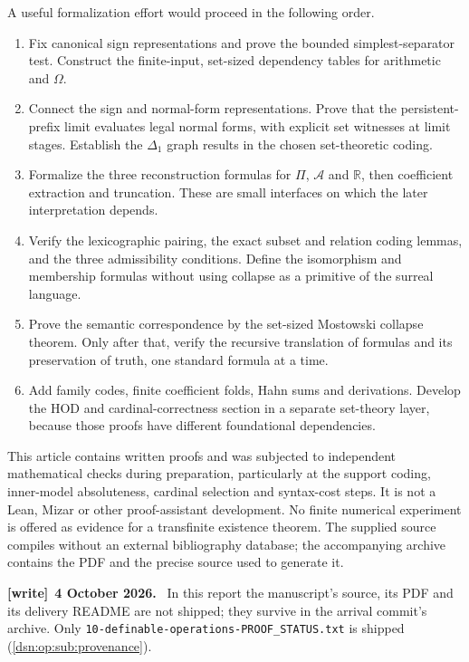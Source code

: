 \documentclass[11pt,a4paper]{article}
\numberwithin{equation}{section}
\theoremstyle{definition}
\theoremstyle{remark}
\newcommand{\R}{\mathbb R}
\newcommand{\fn}[1]{\nolinkurl{#1}}
\newenvironment{writenote}[1][]{\par\medskip\begingroup\small\noindent\textbf{[write]}\if\relax\detokenize{#1}\relax\else~\textbf{#1.}\fi~\ignorespaces}{\par\endgroup\medskip}
\begin{document}
A useful formalization effort would proceed in the following order.
\begin{enumerate}
\item Fix canonical sign representations and prove the bounded
simplest-separator test.  Construct the finite-input, set-sized
dependency tables for arithmetic and \(\Omega\).
\item Connect the sign and normal-form representations.  Prove that
the persistent-prefix limit evaluates legal normal forms, with explicit
set witnesses at limit stages.  Establish the \(\Delta_1\) graph results
in the chosen set-theoretic coding.
\item Formalize the three reconstruction formulas for \(\Pi\),
\(\mathcal A\) and \(\R\), then coefficient extraction and truncation.
These are small interfaces on which the later interpretation depends.
\item Verify the lexicographic pairing, the exact subset and relation
coding lemmas, and the three admissibility conditions.  Define the
isomorphism and membership formulas without using collapse as a
primitive of the surreal language.
\item Prove the semantic correspondence by the set-sized Mostowski
collapse theorem.  Only after that, verify the recursive translation of
formulas and its preservation of truth, one standard formula at a time.
\item Add family codes, finite coefficient folds, Hahn sums and
derivations.  Develop the HOD and cardinal-correctness section in a
separate set-theory layer, because those proofs have different
foundational dependencies.
\end{enumerate}

This article contains written proofs and was subjected to independent
mathematical checks during preparation, particularly at the support
coding, inner-model absoluteness, cardinal selection and syntax-cost
steps.  It is not a Lean, Mizar or other proof-assistant development.
No finite numerical experiment is offered as evidence for a transfinite
existence theorem.  The supplied source compiles without an external
bibliography database; the accompanying archive contains the PDF and
the precise source used to generate it.

\begin{writenote}[4 October 2026]
In this report the manuscript's source, its PDF and its delivery README are
not shipped; they survive in the arrival commit's archive. Only
\fn{10-definable-operations-PROOF_STATUS.txt} is shipped
(\cref{dsn:op:sub:provenance}).
\end{writenote}
\end{document}
